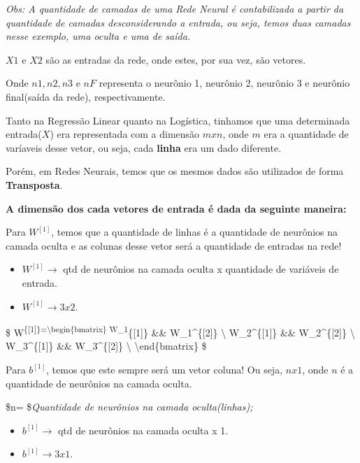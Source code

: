 \documentclass[12pt]{article}
\providecommand{\tightlist}{%
      \setlength{\itemsep}{0pt}\setlength{\parskip}{0pt}}
\begin{document}
\emph{Obs: A quantidade de camadas de uma Rede Neural é contabilizada a
partir da quantidade de camadas desconsiderando a entrada, ou seja,
temos duas camadas nesse exemplo, uma oculta e uma de saída.}

\(X1\) e \(X2\) são as entradas da rede, onde estes, por sua vez, são
vetores.

Onde \(n1, n2, n3\) e \(nF\) representa o neurônio 1, neurônio 2,
neurônio 3 e neurônio final(saída da rede), respectivamente.

Tanto na Regressão Linear quanto na Logística, tinhamos que uma
determinada entrada(\(X\)) era representada com a dimensão \(m x n\),
onde \(m\) era a quantidade de varíaveis desse vetor, ou seja, cada
\textbf{linha} era um dado diferente.

Porém, em Redes Neurais, temos que os mesmos dados são utilizados de
forma \textbf{Transposta}.

\textbf{A dimensão dos cada vetores de entrada é dada da seguinte
maneira:}

Para \(W^{[1]}\), temos que a quantidade de linhas é a quantidade de
neurônios na camada oculta e as colunas desse vetor será a quantidade de
entradas na rede!

\begin{itemize}
\tightlist
\item
  \(W^{[1]} \rightarrow\) qtd de neurônios na camada oculta x quantidade
  de variáveis de entrada.
\item
  \(W^{[1]} \rightarrow 3 x 2\).
\end{itemize}

\$ W\textsuperscript{\{{[}1{]}\}=\textbackslash{}begin\{bmatrix\}
W\_1}\{{[}1{]}\} \&\& W\_1\^{}\{{[}2{]}\} \textbackslash{}
W\_2\^{}\{{[}1{]}\} \&\& W\_2\^{}\{{[}2{]}\} \textbackslash{}
W\_3\^{}\{{[}1{]}\} \&\& W\_3\^{}\{{[}2{]}\} \textbackslash{}
\textbackslash{}end\{bmatrix\} \$

Para \(b^{[1]}\), temos que este sempre será um vetor coluna! Ou seja,
\(nx1\), onde \(n\) é a quantidade de neurônios na camada oculta.

\$n= \$\emph{Quantidade de neurônios na camada oculta(linhas);}

\begin{itemize}
\tightlist
\item
  \(b^{[1]} \rightarrow\) qtd de neurônios na camada oculta x 1.
\item
  \(b^{[1]} \rightarrow 3 x 1\).
\end{itemize}
\end{document}
